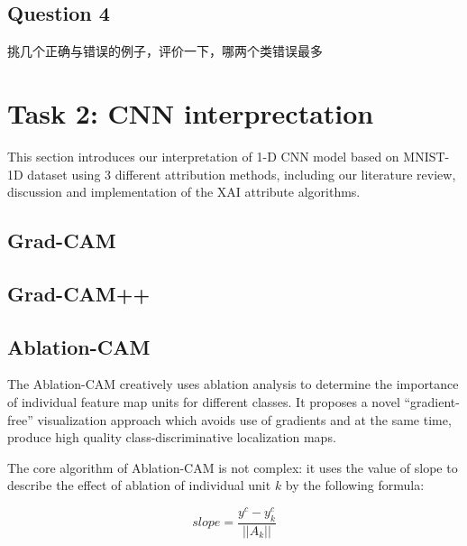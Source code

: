 \documentclass[conference]{IEEEtran}
\begin{document}
\subsection{Question 4}
挑几个正确与错误的例子，评价一下，哪两个类错误最多
\section{Task 2: CNN interprectation}


This section introduces our interpretation of 1-D CNN model based on MNIST-1D dataset using 3 different attribution methods, including our literature review, discussion and implementation of the XAI attribute algorithms.

\subsection{Grad-CAM}

\subsection{Grad-CAM++}

\subsection{Ablation-CAM}

The Ablation-CAM creatively uses ablation analysis to determine the importance of individual feature map units for different classes. It proposes a novel “gradient-free” visualization approach which avoids use of gradients and at the same time, produce high quality class-discriminative localization maps.\par

The core algorithm of Ablation-CAM is not complex: it uses the value of slope to describe the effect of ablation of individual unit $k$ by the following formula:

$$slope = \frac{y^c-y^c_k}{||A_k||}$$
\end{document}
